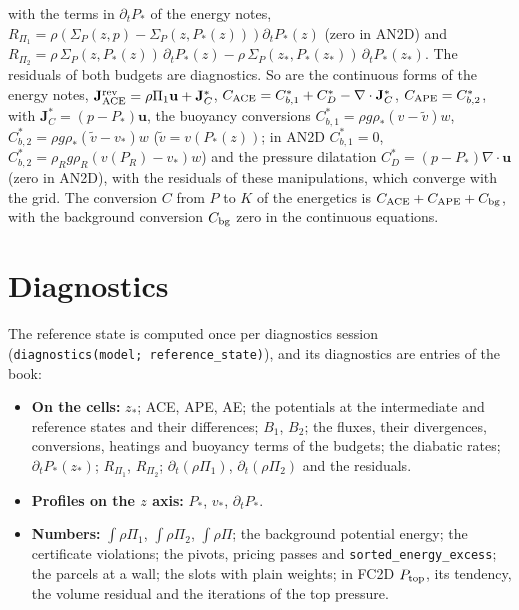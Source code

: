 \documentclass[11pt,a4paper]{article}
\newcommand{\code}[1]{\texttt{#1}}
\newcommand{\Ptop}{P_{\rm top}}
\newcommand{\zs}{z_{*}}
\begin{document}
with the terms in $\partial_tP_*$ of the energy notes,
$R_{\Pi_1}=\rho\left(\Sigma_P(z,p)-\Sigma_P(z,P_*(z))\right)\partial_tP_*(z)$ (zero in AN2D) and
$R_{\Pi_2}=\rho\,\Sigma_P(z,P_*(z))\,\partial_tP_*(z)-\rho\,\Sigma_P(\zs,P_*(\zs))\,\partial_tP_*(\zs)$. The residuals of both
budgets are diagnostics. So are the continuous forms of the energy notes, $\mathbf J^{\rm rev}_{\rm ACE}=\rho\Pi_1\mathbf u+
\mathbf J_C^*$, $C_{\rm ACE}=C_{b,1}^*+C_D^*-\nabla\cdot\mathbf J_C^*$, $C_{\rm APE}=C_{b,2}^*$, with $\mathbf J_C^*=(p-P_*)\mathbf u$,
the buoyancy conversions $C_{b,1}^*=\rho g\rho_*(v-\tilde v)w$, $C_{b,2}^*=\rho g\rho_*(\tilde v-v_*)w$ ($\tilde v=v(P_*(z))$;
in AN2D $C_{b,1}^*=0$, $C_{b,2}^*=\rho_Rg\rho_R(v(P_R)-v_*)w$) and the pressure dilatation $C_D^*=(p-P_*)\nabla\cdot\mathbf u$ (zero in
AN2D), with the residuals of these manipulations, which converge with the grid. The conversion $C$ from $P$ to $K$ of the
energetics is $C_{\rm ACE}+C_{\rm APE}+C_{\rm bg}$, with the background conversion $C_{\rm bg}$ zero in the continuous equations.

\section{Diagnostics}\label{sec:outputs}
The reference state is computed once per diagnostics session (\code{diagnostics(model; reference\_state)}), and its
diagnostics are entries of the book:
\begin{itemize}
  \item \textbf{On the cells:} $\zs$; ACE, APE, AE; the potentials at the intermediate and reference states and their
        differences; $B_1$, $B_2$; the fluxes, their divergences, conversions, heatings and buoyancy terms of the budgets;
        the diabatic rates; $\partial_tP_*(\zs)$; $R_{\Pi_1}$, $R_{\Pi_2}$; $\partial_t(\rho\Pi_1)$, $\partial_t(\rho\Pi_2)$ and the
        residuals.
  \item \textbf{Profiles on the $z$ axis:} $P_*$, $v_*$, $\partial_tP_*$.
  \item \textbf{Numbers:} $\int\rho\Pi_1$, $\int\rho\Pi_2$, $\int\rho\Pi$; the background potential energy; the certificate
        violations; the pivots, pricing passes and \code{sorted\_energy\_excess}; the parcels at a wall; the slots with
        plain weights; in FC2D $\Ptop$, its tendency, the volume residual and the iterations of the top pressure.
\end{itemize}
\end{document}
